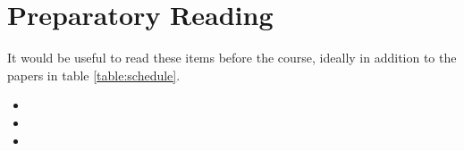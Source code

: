 \documentclass[12pt,\papersize]{extarticle}
\begin{document}
\section{Preparatory Reading}
It would be useful to read these items before the course, ideally in addition to the papers in  table \vref{table:schedule}.

\begin{itemize}
\item {}
\item {}
\item {}
\end{itemize}




\end{document}
